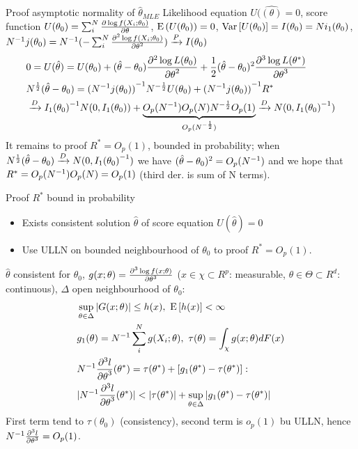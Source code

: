 \documentclass[asd-beamer.tex]{subfiles}%
\begin{document}
\begin{frame}{Proof asymptotic normality of $\hat{\theta}_{MLE}$}
            Likelihood equation $U(\hat{(\theta)}=0$, score function $U(\theta_0)=\sum_i^N\frac{\partial \log{f(X_i;\theta_0)}}{\partial \theta}$, $\operatorname{E}{(U(\theta_0))}=0$, $\operatorname{Var}{[U(\theta_0)]}=I(\theta_0)=Ni_1(\theta_0)$, ${N}^{-1}j(\theta_0)={N}^{-1}(-\sum_i^N\frac{\partial^2 \log{f(X_i;\theta_0)}}{{\partial \theta}^2})\xrightarrow{P}I(\theta_0)$
            \begin{align*}
                &0=U(\hat{\theta})=U(\theta_0)+(\hat{\theta}-\theta_0)\frac{\partial^2 \log{L(\theta_0)}}{{\partial \theta}^2}+\frac{1}{2}(\hat{\theta}-\theta_0)^2\frac{\partial^{3} \log{L(\theta^*)}}{{\partial \theta}^{3}}\\
                &N^{\frac{1}{2}}(\hat{\theta}-\theta_0)={({N}^{-1}j(\theta_0))}^{-1}N^{-\frac{1}{2}}U(\theta_0)+{({N}^{-1}j(\theta_0))}^{-1}R^*\\
                &\xrightarrow{D}{I_1(\theta_0)}^{-1}N(0,I_1(\theta_0))+\underbrace{O_p({N}^{-1})O_p(N)N^{-\frac{1}{2}}O_p(1)}_{O_p(N^{-\frac{1}{2}})}\xrightarrow{D}{}N(0,{I_1(\theta_0)}^{-1})
            \end{align*}
        It remains to proof $R^*=O_p(1)$, bounded in probability; when $N^{\frac{1}{2}}(\hat{\theta}-\theta_0)\xrightarrow{D}{}N(0,{I_1(\theta_0)}^{-1})$ we have $(\hat{\theta}-\theta_0)^2=O_p({N}^{-1})$ and we hope that $R^*=O_p({N}^{-1})O_p(N)=O_p(1)$ (third der. is sum of N terms).
\end{frame}

\begin{frame}{Proof $R^*$ bound in probability}
    \begin{itemize}
        \item Exists consistent solution $\hat{\theta}$ of score equation $U(\hat{\theta})=0$
        \item Use ULLN on bounded neighbourhood of $\theta_0$ to proof $R^*=O_p(1)$.
    \end{itemize}
    $\hat{\theta}$ consistent for $\theta_0$, $g(x;\theta)=\frac{\partial^{3} \log{f(x;\theta)}}{{\partial \theta}^{3}}$ ($x\in\chi\subset R^p$: measurable, $\theta\in\Theta\subset R^d$: continuous), $\Delta$ open neighbourhood of $\theta_0$:
    \begin{align*}
        &\sup_{\theta\in\Delta}|G(x;\theta)|\leq h(x),\ \E{[h(x)]}<\infty\\
        &g_1(\theta)=\invers{N}\sum_i^Ng(X_i;\theta),\ \tau(\theta)=\int_{\chi}g(x;\theta)dF(x)\\
        &\invers{N}\PxDy{\theta}{3}{l}(\theta^*)=\tau(\theta^*)+[g_1(\theta^*)-\tau(\theta^*)]:\\
        &|\invers{N}\PxDy{\theta}{3}{l}(\theta^*)|<|\tau(\theta^*)|+\sup_{\theta\in\Delta}|g_1(\theta^*)-\tau(\theta^*)|
    \end{align*}
    First term tend to $\tau(\theta_0)$ (consistency), second term is $o_p(1)$ bu ULLN, hence ${N}^{-1}\frac{\partial^{3} l}{{\partial \theta}^{3}}=O_p(1)$.
\end{frame}
\end{document}
